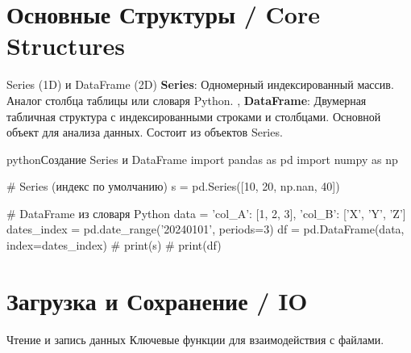 
\section{Основные Структуры / Core Structures}

\begin{textbox}{Series (1D) и DataFrame (2D)}
\textbf{Series}: Одномерный индексированный массив. Аналог столбца таблицы или словаря Python. \sep %
\textbf{DataFrame}: Двумерная табличная структура с индексированными строками и столбцами. Основной объект для анализа данных. Состоит из объектов Series.

\begin{codebox}{python}{Создание Series и DataFrame}
import pandas as pd
import numpy as np

# Series (индекс по умолчанию)
s = pd.Series([10, 20, np.nan, 40])

# DataFrame из словаря Python
data = {'col_A': [1, 2, 3], 'col_B': ['X', 'Y', 'Z']}
dates_index = pd.date_range('20240101', periods=3)
df = pd.DataFrame(data, index=dates_index)
# print(s)
# print(df)
\end{codebox}
\end{textbox}

\section{Загрузка и Сохранение / IO}

\begin{myblock}{Чтение и запись данных}
Ключевые функции для взаимодействия с файлами.
\end{myblock}

